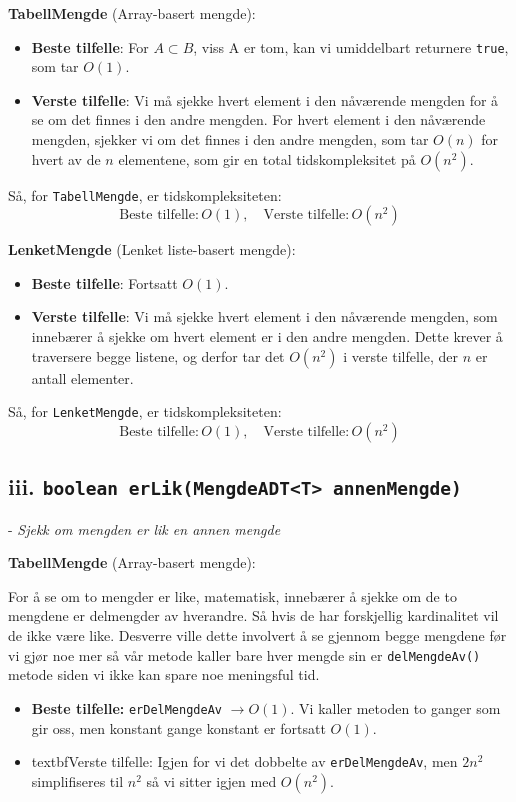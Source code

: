 \documentclass[12pt]{article}
\begin{document}
\textbf{TabellMengde} (Array-basert mengde):
\begin{itemize}
    \item \textbf{Beste tilfelle}: For \(A \subset B\), viss A er tom, kan vi umiddelbart returnere \texttt{true}, som tar \(O(1)\).
    \item \textbf{Verste tilfelle}: Vi må sjekke hvert element i den nåværende mengden for å se om det finnes i den andre mengden. For hvert element i den nåværende mengden, sjekker vi om det finnes i den andre mengden, som tar \(O(n)\) for hvert av de \(n\) elementene, som gir en total tidskompleksitet på \(O(n^2)\).
\end{itemize}

Så, for \texttt{TabellMengde}, er tidskompleksiteten:
\[
\text{Beste tilfelle}: O(1), \quad \text{Verste tilfelle}: O(n^2)
\]

\textbf{LenketMengde} (Lenket liste-basert mengde):
\begin{itemize}
    \item \textbf{Beste tilfelle}: Fortsatt \(O(1)\).
    \item \textbf{Verste tilfelle}: Vi må sjekke hvert element i den nåværende mengden, som innebærer å sjekke om hvert element er i den andre mengden. Dette krever å traversere begge listene, og derfor tar det \(O(n^2)\) i verste tilfelle, der \(n\) er antall elementer.
\end{itemize}

Så, for \texttt{LenketMengde}, er tidskompleksiteten:
\[
\text{Beste tilfelle}: O(1), \quad \text{Verste tilfelle}: O(n^2)
\]

\subsection*{iii. \texttt{boolean erLik(MengdeADT<T> annenMengde)}} - \textit{Sjekk om mengden er lik en annen mengde}

\noindent
\textbf{TabellMengde} (Array-basert mengde):

\noindent 
For å se om to mengder er like, matematisk, innebærer å sjekke om de to mengdene 
        er delmengder av hverandre. Så hvis de har forskjellig kardinalitet 
        vil de ikke være like. Desverre ville dette involvert å se gjennom begge 
        mengdene før vi gjør noe mer så vår metode kaller bare hver mengde sin 
        er \texttt{delMengdeAv()} metode siden vi ikke kan spare noe meningsful tid.  
\begin{itemize}
    \item \textbf{Beste tilfelle:} \texttt{erDelMengdeAv} \(\rightarrow O(1)\). 
        Vi kaller metoden to ganger som gir oss, men konstant gange konstant 
        er fortsatt \(O(1)\). 
    \item textbf{Verste tilfelle:} Igjen for vi det dobbelte av \texttt{erDelMengdeAv},
        men \(2n^2\) simplifiseres til \(n^2\) så vi sitter igjen med \(O(n^2)\).

\end{itemize}
\end{document}
